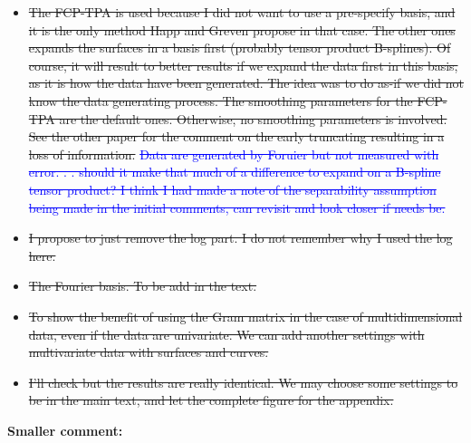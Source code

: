 \documentclass[11pt]{article}
\begin{document}
\begin{itemize}
  \item \sout{The FCP-TPA is used because I did not want to use a pre-specify basis, and it is the only method Happ and Greven propose in that case. The other ones expands the surfaces in a basis first (probably tensor product B-splines). Of course, it will result to better results if we expand the data first in this basis, as it is how the data have been generated. The idea was to do as-if we did not know the data generating process.
  The smoothing parameters for the FCP-TPA are the default ones. Otherwise, no smoothing parameters is involved. See the other paper for the comment on the early truncating resulting in a loss of information.} \textcolor{blue}{\sout{Data are generated by Foruier but not measured with error. . . should it make that much of a difference to expand on a B-spline tensor product? I think I had made a note of the separability assumption being made in the initial comments, can revisit and look closer if needs be.}}
  \item \sout{I propose to just remove the log part. I do not remember why I used the log here.}
  \item \sout{The Fourier basis. To be add in the text.}
  \item \sout{To show the benefit of using the Gram matrix in the case of multidimensional data, even if the data are univariate. We can add another settings with multivariate data with surfaces and curves.}
  \item \sout{I'll check but the results are really identical. We may choose some settings to be in the main text, and let the complete figure for the appendix.}
\end{itemize}


\bigskip


\itshape


\textbf{Smaller comment:}
\end{document}
